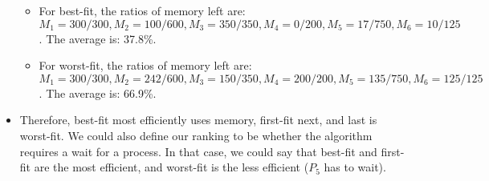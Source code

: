 \documentclass[12pt]{article}
\begin{document}
\begin{itemize}
\begin{itemize}
\item For best-fit, the ratios of memory left are: $M_{1} = 300/300, M_{2} = 100/600, M_{3} = 350/350, M_{4} = 0/200, M_{5} = 17/750, M_{6} = 10/125$. The average is: 37.8\%.
\item For worst-fit, the ratios of memory left are: $M_{1} = 300/300, M_{2} = 242/600, M_{3} = 150/350, M_{4} = 200/200, M_{5} = 135/750, M_{6} = 125/125$. The average is: 66.9\%.
\end{itemize}
\item Therefore, best-fit most efficiently uses memory, first-fit next, and last is worst-fit. We could also define our ranking to be whether the algorithm requires a wait for a process. In that case, we could say that best-fit and first-fit are the most efficient, and worst-fit is the less efficient ($P_{5}$ has to wait).
\end{itemize}
\end{document}
